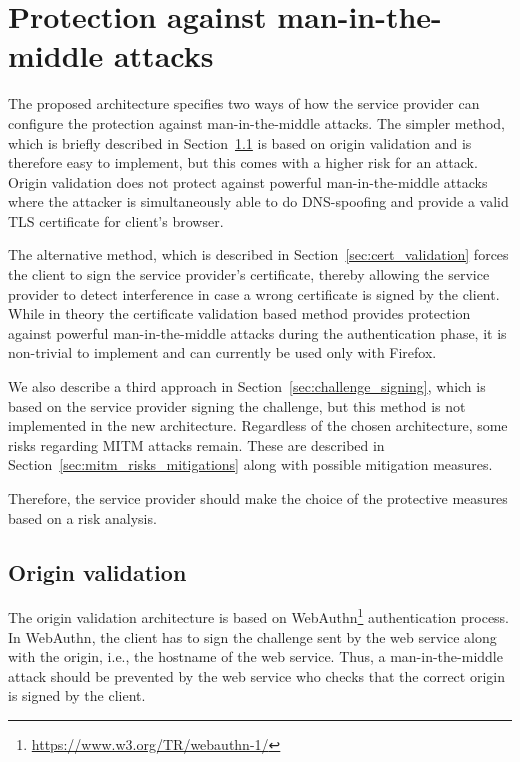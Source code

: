 \chapter{Protection against man-in-the-middle attacks}\label{sec:protection_profiles}
The proposed architecture specifies two ways of how the service provider can configure the protection against man-in-the-middle attacks. The simpler method, which is briefly described in Section~\ref{sec:origin_validation} is based on origin validation and is therefore easy to implement, but this comes with a higher risk for an attack. Origin validation does not protect against powerful man-in-the-middle attacks where the attacker is simultaneously able to do DNS-spoofing and provide a valid TLS certificate for client's browser.

The alternative method, which is described in Section~\ref{sec:cert_validation} forces the client to sign the service provider's certificate, thereby allowing the service provider to detect interference in case a wrong certificate is signed by the client. While in theory the certificate validation based method provides protection against powerful man-in-the-middle attacks during the authentication phase, it is non-trivial to implement and can currently be used only with Firefox. 

We also describe a third approach in Section~\ref{sec:challenge_signing}, which is based on the service provider signing the challenge, but this method is not implemented in the new architecture. Regardless of the chosen architecture, some risks regarding MITM attacks remain. These are described in Section~\ref{sec:mitm_risks_mitigations} along with possible mitigation measures.

Therefore, the service provider should make the choice of the protective measures based on a risk analysis.

\section{Origin validation}
\label{sec:origin_validation}
The origin validation architecture is based on WebAuthn\footnote{\url{https://www.w3.org/TR/webauthn-1/}} authentication process. In WebAuthn, the client has to sign the challenge sent by the web service along with the origin, i.e., the hostname of the web service. Thus, a man-in-the-middle attack should be prevented by the web service who checks that the correct origin is signed by the client.

